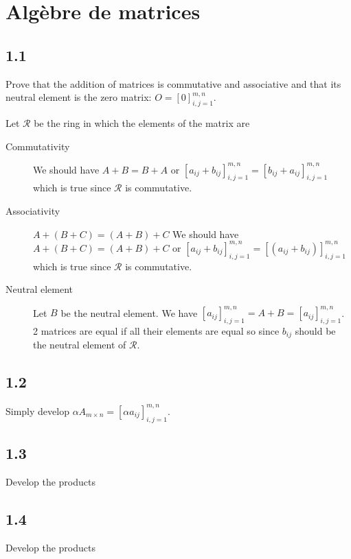 \section{Algèbre de matrices}
\subsection*{1.1}
Prove that the addition of matrices is commutative and associative and that its neutral element is the zero matrix: $O = [0]_{i,j=1}^{m,n}$.
\begin{solution}
  Let $\mathcal{R}$ be the ring in which the elements of the matrix are
  \begin{description}
    \item[Commutativity]
      We should have $A+B=B+A$ or
      $[a_{ij} + b_{ij}]_{i,j=1}^{m,n} = [b_{ij} + a_{ij}]_{i,j=1}^{m,n}$
      which is true since $\mathcal{R}$ is commutative.
    \item[Associativity] $A+(B+C)=(A+B)+C$
      We should have $A+(B+C)=(A+B)+C$ or
      $[a_{ij} + b_{ij}]_{i,j=1}^{m,n} = [(a_{ij} + b_{ij})]_{i,j=1}^{m,n}$
      which is true since $\mathcal{R}$ is commutative.
    \item[Neutral element] Let $B$ be the neutral element.
      We have
      $[a_{ij}]_{i,j=1}^{m,n} = A + B = [a_{ij}]_{i,j=1}^{m,n}$.
      2 matrices are equal if all their elements are equal so since $b_{ij}$
      should be the neutral element of $\mathcal{R}$.
  \end{description}
\end{solution}

\subsection*{1.2}
\begin{solution}
  Simply develop $\alpha A_{m \times n}=[\alpha a_{ij}]_{i,j=1}^{m,n}$.
\end{solution}

\subsection*{1.3}
\begin{solution}
  Develop the products
\end{solution}

\subsection*{1.4}
\begin{solution}
  Develop the products
\end{solution}

